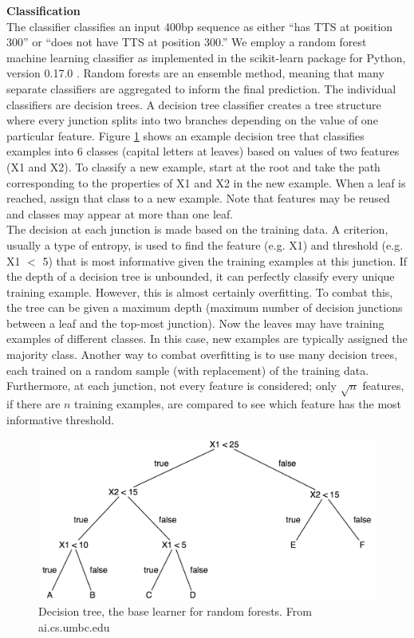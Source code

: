 \documentclass[12pt,letterpaper]{report}
\begin{document}
{\Large\textbf{Classification}}\\

The classifier classifies an input 400bp sequence as either ``has TTS at position 300'' or ``does not have TTS at position 300.'' We employ a random forest machine learning classifier \cite{rf} as implemented in the scikit-learn package for Python, version 0.17.0 \cite{scikit-learn}. Random forests are an ensemble method, meaning that many separate classifiers are aggregated to inform the final prediction. The individual classifiers are decision trees. A decision tree classifier creates a tree structure where every junction splits into two branches depending on the value of one particular feature. Figure \ref{fig:dtree} shows an example decision tree that classifies examples into 6 classes (capital letters at leaves) based on values of two features (X1 and X2). To classify a new example, start at the root and take the path corresponding to the properties of X1 and X2 in the new example. When a leaf is reached, assign that class to a new example. Note that features may be reused and classes may appear at more than one leaf. \\

\indent The decision at each junction is made based on the training data. A criterion, usually a type of entropy, is used to find the feature (e.g. X1) and threshold (e.g. X1 $<$ 5) that is most informative given the training examples at this junction. If the depth of a decision tree is unbounded, it can perfectly classify every unique training example. However, this is almost certainly overfitting. To combat this, the tree can be given a maximum depth (maximum number of decision junctions between a leaf and the top-most junction). Now the leaves may have training examples of different classes. In this case, new examples are typically assigned the majority class. Another way to combat overfitting is to use many decision trees, each trained on a random sample (with replacement) of the training data. Furthermore, at each junction, not every feature is considered; only $\sqrt{n}$ features, if there are $n$ training examples, are compared to see which feature has the most informative threshold.\\

\begin{figure}[h]
\centering
\includegraphics[scale=0.8]{dtree.jpg}
\caption{Decision tree, the base learner for random forests. From ai.cs.umbc.edu}
\label{fig:dtree}
\end{figure}
\end{document}
